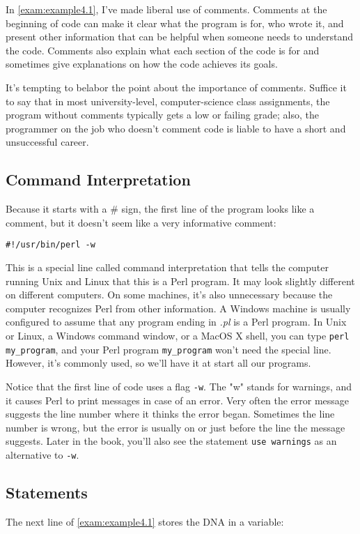 In \autoref{exam:example4.1}, I've made liberal use of comments. Comments at the beginning of code can make it clear what the program is for, who wrote it, and present other information that can be helpful when someone needs to understand the code. Comments also explain what each section of the code is for and sometimes give explanations on how the code achieves its goals.

It's tempting to belabor the point about the importance of comments. Suffice it to say that in most university-level, computer-science class assignments, the program without comments typically gets a low or failing grade; also, the programmer on the job who doesn't comment code is liable to have a short and unsuccessful career.

\subsection{Command Interpretation}
Because it starts with a \# sign, the first line of the program looks like a comment, but it doesn't seem like a very informative comment:

\begin{lstlisting}
#!/usr/bin/perl -w
\end{lstlisting}

This is a special line called command interpretation that tells the computer running Unix and Linux that this is a Perl program. It may look slightly different on different computers. On some machines, it's also unnecessary because the computer recognizes Perl from other information. A Windows machine is usually configured to assume that any program ending in \textit{.pl} is a Perl program. In Unix or Linux, a Windows command window, or a MacOS X shell, you can type \verb|perl my_program|, and your Perl program \verb|my_program| won't need the special line. However, it's commonly used, so we'll have it at start all our programs.

Notice that the first line of code uses a flag \verb|-w|. The "w" stands for warnings, and it causes Perl to print messages in case of an error. Very often the error message suggests the line number where it thinks the error began. Sometimes the line number is wrong, but the error is usually on or just before the line the message suggests. Later in the book, you'll also see the statement \verb|use warnings| as an alternative to \verb|-w|. 

\subsection{Statements}
The next line of \autoref{exam:example4.1} stores the DNA in a variable:


